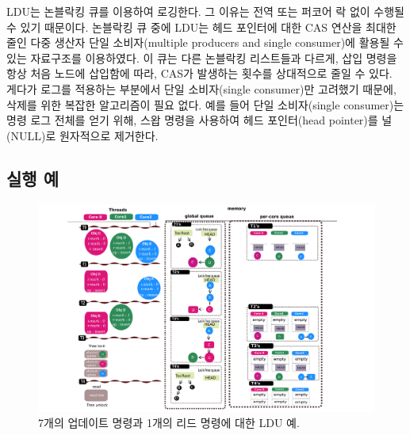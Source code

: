 LDU는  논블락킹 큐를 이용하여 로깅한다. 그 이유는 전역 또는 퍼코어 락 없이 수행될 수 
있기 때문이다. 
논블락킹 큐 중에 LDU는 헤드 포인터에 대한 CAS 연산을 최대한 줄인 다중 생산자 단일 소비자(multiple producers
and single consumer)에 활용될 수 있는 자료구조를 이용하였다.
이 큐는 다른 논블락킹 리스트들과 다르게, 삽입 명령을 항상 처음 노드에 삽입함에
따라, CAS가 발생하는 횟수를 상대적으로 줄일 수 있다.
게다가 로그를 적용하는 부분에서 단일 소비자(single consumer)만 고려했기 때문에, 
삭제를 위한 복잡한 알고리즘이 필요 없다. 
예를 들어 단일 소비자(single consumer)는 명령 로그 전체를 얻기 위해, 스왑 명령을 사용하여
 헤드 포인터(head pointer)를 널(NULL)로 원자적으로 제거한다. 


\subsection{실행 예}
\begin{figure}[h]
  \begin{center}
     \includegraphics[width=1.0\textwidth,height=0.4\textheight]{fig/basic_gldu}
  \end{center}
  \caption{7개의 업데이트 명령과 1개의 리드 명령에 대한 LDU 예.}
  \label{fig:basic}
\end{figure}

